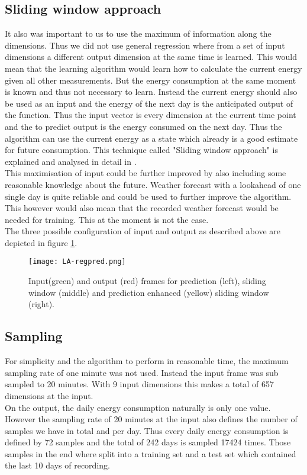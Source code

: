 \documentclass[conference]{IEEEtran}
\begin{document}
\subsection{Sliding window approach}
It also was important to us to use the maximum of information along the dimensions. Thus we did not use general regression where from a set of input dimensions a different output dimension at the same time is learned. This would mean that the learning algorithm would learn how to calculate the current energy given all other measurements. But the energy consumption at the same moment is known and thus not necessary to learn. Instead the current energy should also be used as an input and the energy of the next day is the anticipated output of the function. Thus the input vector is every dimension at the current time point and the to predict output is the energy consumed on the next day. Thus the algorithm can use the current energy as a state which already is a good estimate for future consumption. This technique called "Sliding window approach" is explained and analysed in detail in \cite{vafaeipour2014application}.\\
This maximisation of input could be further improved by also including some reasonable knowledge about the future. Weather forecast with a lookahead of one single day is quite reliable and could be used to further improve the algorithm. This however would also mean that the recorded weather forecast would be needed for training. This at the moment is not the case.\\
The three possible configuration of input and output as described above are depicted in figure \ref{fig:timeshift}.

\begin{figure}[!t] 
\centering 
\texttt{[image: LA-regpred.png]} 
\caption{Input(green) and output (red) frames for prediction (left), sliding window (middle) and prediction enhanced (yellow) sliding window (right).} 
\label{fig:timeshift} 
\end{figure}

\subsection{Sampling}
For simplicity and the algorithm to perform in reasonable time, the maximum sampling rate of one minute was not used. Instead the input frame was sub sampled to 20 minutes. With 9 input dimensions this makes a total of 657 dimensions at the input.\\
On the output, the daily energy consumption naturally is only one value. However the sampling rate of 20 minutes at the input also defines the number of samples we have in total and per day. Thus every daily energy consumption is defined by 72 samples and the total of 242 days is sampled 17424 times. Those samples in the end where split into a training set and a test set which contained the last 10 days of recording.
\end{document}
